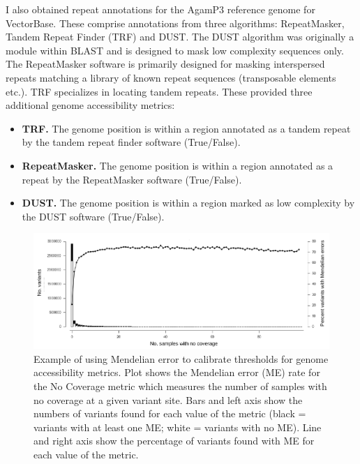 \documentclass[a4paper,11pt,abstracton,hidelinks]{scrartcl}
\begin{document}
I also obtained repeat annotations for the AgamP3 reference genome for VectorBase.
%
These comprise annotations from three algorithms: RepeatMasker, Tandem Repeat Finder (TRF) and DUST.
%
The DUST algorithm was originally a module within BLAST \citep{Altschul1990} and is designed to mask low complexity sequences only.
%
The RepeatMasker software \citep{Smit2013} is primarily designed for masking interspersed repeats matching a library of known repeat sequences (transposable elements etc.).
%
TRF \citep{Benson1999} specializes in locating tandem repeats.
%
These provided three additional genome accessibility metrics:
%
\begin{itemize}
%
\item \textbf{TRF.} The genome position is within a region annotated as a tandem repeat by the tandem repeat finder software (True/False).
%
\item \textbf{RepeatMasker.} The genome position is within a region annotated as a repeat by the RepeatMasker software (True/False).
%
\item \textbf{DUST.} The genome position is within a region marked as low complexity by the DUST software (True/False).
%
\end{itemize}


\begin{figure}[t!]
\centering
\includegraphics[width=\textwidth]{artwork/chapter3/me_nodp.pdf}
\caption{Example of using Mendelian error to calibrate thresholds for genome accessibility metrics.
%
Plot shows the Mendelian error (ME) rate for the No Coverage metric which measures the number of samples with no coverage at a given variant site.
%
Bars and left axis show the numbers of variants found for each value of the metric (black = variants with at least one ME; white = variants with no ME).
%
Line and right axis show the percentage of variants found with ME for each value of the metric.
%
}
%
\label{fig:me_nodp}
\end{figure}
\end{document}
